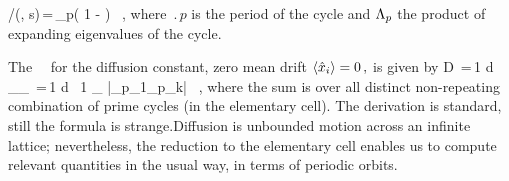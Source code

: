 %
/\zeta(\beta, s)\,=\,\prod_{p}\left( 1 -  \right) ~,
\label{zeta-diff}
\eeq
where $\period{p}$ is the period of the cycle and $\Lambda_p$ the
product of expanding eigenvalues of the cycle.

The \dzeta\ \cycForm\ for the diffusion constant, zero mean drift
$ \langle { \hat{x}_i } \rangle = 0 \,, $ is given by
 \beq D \,=\,{1  d}
{ _\zeta \over \expct{\period{}}_\zeta } \,=\,{1
   d } \, {1 \over \expct{\period{}}_\zeta} \sumprime
{}
{|\ExpaEig_{p_1}\cdots \ExpaEig_{p_k}|} \, ,
\label{eq-ecDiffCoef}
\eeq
where the sum is over all distinct non-repeating combination of prime
cycles (in the elementary cell). The derivation is standard, still the
formula is strange.Diffusion is unbounded motion across an infinite
lattice; nevertheless, the reduction to the elementary cell enables us to
compute relevant quantities in the usual way, in terms of periodic
orbits.
